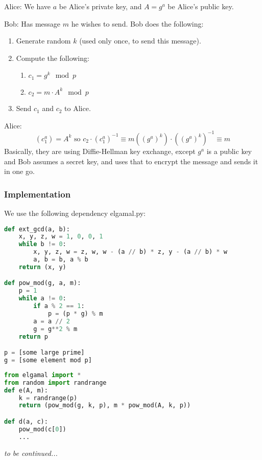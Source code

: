 Alice: We have $a$ be Alice's private key, and $A = g^a$ be Alice's public key.

Bob: Has message $m$ he wishes to send. Bob does the following:
\begin{enumerate}
    \item Generate random $k$ (used only once, to send this message).
    \item Compute the following:
          \begin{enumerate}
              \item $c_1 = g^k\mod{p}$
              \item $c_2 = m\cdot A^k \mod{p}$
          \end{enumerate}
    \item Send $c_1$ and $c_2$ to Alice.
\end{enumerate}

Alice:
\[(c_1^a) = A^k \text{ so } c_2\cdot (c_1^a)^{-1}\equiv m\left((g^a)^k\right)\cdot \left((g^a)^k\right)^{-1} \equiv m\]
Basically, they are using Diffie-Hellman key exchange, except $g^a$ is a public key and Bob assumes a secret key, and uses that to encrypt the message and sends it in one go.

\subsubsection{Implementation}
We use the following dependency \textsf{elgamal.py}: 
\begin{lstlisting}[language=Python]
def ext_gcd(a, b):
    x, y, z, w = 1, 0, 0, 1
    while b != 0:
        x, y, z, w = z, w, w - (a // b) * z, y - (a // b) * w
        a, b = b, a % b
    return (x, y)

def pow_mod(g, a, m):
    p = 1
    while a != 0:
        if a % 2 == 1:
            p = (p * g) % m
        a = a // 2
        g = g**2 % m
    return p

p = [some large prime]
g = [some element mod p]
\end{lstlisting}

\begin{lstlisting}[language=Python]
from elgamal import * 
from random import randrange
def e(A, m): 
    k = randrange(p)
    return (pow_mod(g, k, p), m * pow_mod(A, k, p))

def d(a, c):
    pow_mod(c[0])
    ...
\end{lstlisting}
\emph{to be continued...}